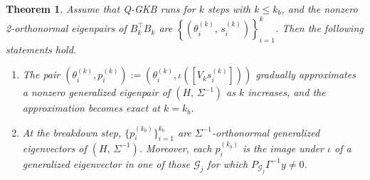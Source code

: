 \documentclass[10pt,a4paper]{amsart}
\newtheorem{theorem}{Theorem}
\begin{document}
\begin{theorem}\label{thm:qgkb-lanczos}
  Assume that Q-GKB runs for $k$ steps with $k\leq k_b$, and the nonzero 2-orthonormal eigenpairs of $B_{k}^{\top}B_{k}$ are $\left\{(\theta_{i}^{(k)},\,s_{i}^{(k)})\right\}_{i=1}^{k}$. Then the following statements hold.
\begin{enumerate}
  \item[(a)] The pair $\left(\theta_{i}^{(k)}, p_{i}^{(k)}\right):=\left(\theta_{i}^{(k)},\iota\left([V_{k}s_{i}^{(k)}]\right)\right)$ gradually approximates a nonzero generalized eigenpair of $(H,\,\Sigma^{-1})$ as $k$ increases, and the approximation becomes exact at $k=k_b$.
  \item[(b)] At the breakdown step, $\{p_{i}^{(k_b)}\}_{i=1}^{k_b}$ are $\Sigma^{-1}$-orthonormal generalized eigenvectors of $(H,\,\Sigma^{-1})$. Moreover, each $p_i^{(k_b)}$ is the image under $\iota$ of a generalized eigenvector in one of those $\mathcal G_j$ for which $P_{\mathcal G_j}\Gamma^{-1}y\neq 0$. 
\end{enumerate}
\end{theorem}
\end{document}
